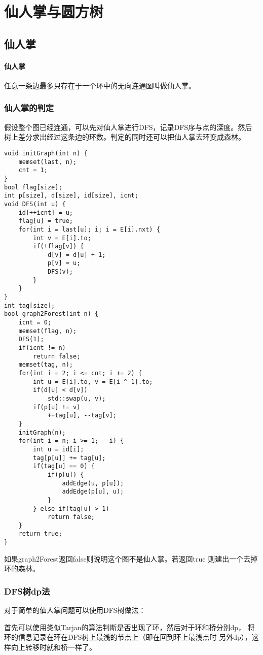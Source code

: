 \section{仙人掌与圆方树}
\subsection{仙人掌}
\paragraph{仙人掌} 任意一条边最多只存在于一个环中的无向连通图叫做仙人掌。
\subsubsection{仙人掌的判定}
假设整个图已经连通，可以先对仙人掌进行DFS，记录DFS序与点的深度。然后
树上差分求出经过这条边的环数。判定的同时还可以把仙人掌去环变成森林。
\begin{lstlisting}
void initGraph(int n) {
    memset(last, n);
    cnt = 1;
}
bool flag[size];
int p[size], d[size], id[size], icnt;
void DFS(int u) {
    id[++icnt] = u;
    flag[u] = true;
    for(int i = last[u]; i; i = E[i].nxt) {
        int v = E[i].to;
        if(!flag[v]) {
            d[v] = d[u] + 1;
            p[v] = u;
            DFS(v);
        }
    }
}
int tag[size];
bool graph2Forest(int n) {
    icnt = 0;
    memset(flag, n);
    DFS(1);
    if(icnt != n)
        return false;
    memset(tag, n);
    for(int i = 2; i <= cnt; i += 2) {
        int u = E[i].to, v = E[i ^ 1].to;
        if(d[u] < d[v])
            std::swap(u, v);
        if(p[u] != v)
            ++tag[u], --tag[v];
    }
    initGraph(n);
    for(int i = n; i >= 1; --i) {
        int u = id[i];
        tag[p[u]] += tag[u];
        if(tag[u] == 0) {
            if(p[u]) {
                addEdge(u, p[u]);
                addEdge(p[u], u);
            }
        } else if(tag[u] > 1)
            return false;
    }
    return true;
}
\end{lstlisting}
如果graph2Forest返回false则说明这个图不是仙人掌。若返回true
则建出一个去掉环的森林。
\subsubsection{DFS树dp法}
对于简单的仙人掌问题可以使用DFS树做法：

首先可以使用类似Tarjan的算法判断是否出现了环，然后对于环和桥分别dp，
将环的信息记录在环在DFS树上最浅的节点上（即在回到环上最浅点时
另外dp），这样向上转移时就和桥一样了。

